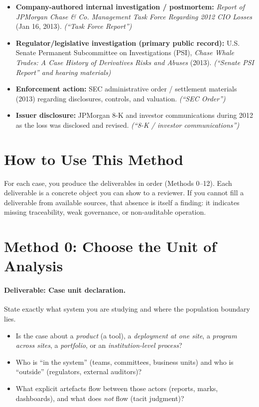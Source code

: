 \begin{itemize}
  \item \textbf{Company-authored internal investigation / postmortem:}
        \emph{Report of JPMorgan Chase \& Co. Management Task Force Regarding 2012 CIO Losses}
        (Jan 16, 2013). \emph{(“Task Force Report”)}
  \item \textbf{Regulator/legislative investigation (primary public record):}
        U.S. Senate Permanent Subcommittee on Investigations (PSI), \emph{Chase Whale Trades: A Case History of Derivatives Risks and Abuses}
        (2013). \emph{(“Senate PSI Report” and hearing materials)}
  \item \textbf{Enforcement action:}
        SEC administrative order / settlement materials (2013) regarding disclosures, controls, and valuation.
        \emph{(“SEC Order”)}
  \item \textbf{Issuer disclosure:}
        JPMorgan 8-K and investor communications during 2012 as the loss was disclosed and revised.
        \emph{(“8-K / investor communications”)}
\end{itemize}

\section{How to Use This Method}

For each case, you produce the deliverables in order (Methods 0--12). Each deliverable is a concrete object
you can show to a reviewer. If you cannot fill a deliverable from available sources, that absence is itself
a finding: it indicates missing traceability, weak governance, or non-auditable operation.

\section{Method 0: Choose the Unit of Analysis}
\label{sec:m0-unit}

\paragraph{Deliverable: Case unit declaration.}
State exactly what system you are studying and where the population boundary lies.

\begin{itemize}
  \item Is the case about a \emph{product} (a tool), a \emph{deployment at one site}, a \emph{program across sites},
        a \emph{portfolio}, or an \emph{institution-level process}?
  \item Who is “in the system” (teams, committees, business units) and who is “outside” (regulators, external auditors)?
  \item What explicit artefacts flow between those actors (reports, marks, dashboards), and what does \emph{not} flow (tacit judgment)?
\end{itemize}

